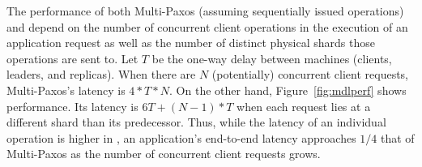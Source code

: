 The performance of both Multi-Paxos (assuming sequentially issued operations) and \sys{} depend on the number of concurrent client operations in the execution of an
application request as well as the number of distinct physical shards those
operations are sent to. Let $T$ be the one-way delay between machines (clients,
leaders, and replicas).  When there are $N$ (potentially) concurrent client
requests, Multi-Paxos's latency is $4*T*N$. On the other hand,
Figure~\ref{fig:mdlperf} shows \sys{} performance. Its latency
is $6T + (N-1)*T$ when each request lies at a different shard
than its predecessor.  Thus, while the latency of an individual operation is
higher in \sys{}, an application's end-to-end latency approaches
$1/4$ that of Multi-Paxos as the number of concurrent client requests grows.






